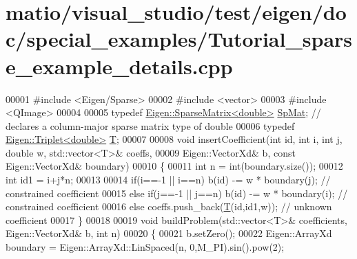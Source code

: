 \hypertarget{matio_2visual__studio_2test_2eigen_2doc_2special__examples_2_tutorial__sparse__example__details_8cpp_source}{}\section{matio/visual\+\_\+studio/test/eigen/doc/special\+\_\+examples/\+Tutorial\+\_\+sparse\+\_\+example\+\_\+details.cpp}
\label{matio_2visual__studio_2test_2eigen_2doc_2special__examples_2_tutorial__sparse__example__details_8cpp_source}

\begin{DoxyCode}
00001 \textcolor{preprocessor}{#include <Eigen/Sparse>}
00002 \textcolor{preprocessor}{#include <vector>}
00003 \textcolor{preprocessor}{#include <QImage>}
00004 
00005 \textcolor{keyword}{typedef} \hyperlink{group___sparse_core___module}{Eigen::SparseMatrix<double>} \hyperlink{group___sparse_core___module}{SpMat}; \textcolor{comment}{// declares a column-major
       sparse matrix type of double}
00006 \textcolor{keyword}{typedef} \hyperlink{group___sparse_core___module}{Eigen::Triplet<double>} \hyperlink{group___sparse_core___module_class_eigen_1_1_triplet}{T};
00007 
00008 \textcolor{keywordtype}{void} insertCoefficient(\textcolor{keywordtype}{int} \textcolor{keywordtype}{id}, \textcolor{keywordtype}{int} i, \textcolor{keywordtype}{int} j, \textcolor{keywordtype}{double} w, std::vector<T>& coeffs,
00009                        Eigen::VectorXd& b, \textcolor{keyword}{const} Eigen::VectorXd& boundary)
00010 \{
00011   \textcolor{keywordtype}{int} n = int(boundary.size());
00012   \textcolor{keywordtype}{int} id1 = i+j*n;
00013 
00014         \textcolor{keywordflow}{if}(i==-1 || i==n) b(\textcolor{keywordtype}{id}) -= w * boundary(j); \textcolor{comment}{// constrained coefficient}
00015   \textcolor{keywordflow}{else}  \textcolor{keywordflow}{if}(j==-1 || j==n) b(\textcolor{keywordtype}{id}) -= w * boundary(i); \textcolor{comment}{// constrained coefficient}
00016   \textcolor{keywordflow}{else}  coeffs.push\_back(\hyperlink{group___sparse_core___module_class_eigen_1_1_triplet}{T}(\textcolor{keywordtype}{id},id1,w));              \textcolor{comment}{// unknown coefficient}
00017 \}
00018 
00019 \textcolor{keywordtype}{void} buildProblem(std::vector<T>& coefficients, Eigen::VectorXd& b, \textcolor{keywordtype}{int} n)
00020 \{
00021   b.setZero();
00022   Eigen::ArrayXd boundary = Eigen::ArrayXd::LinSpaced(n, 0,M\_PI).sin().pow(2);

\end{DoxyCode}
